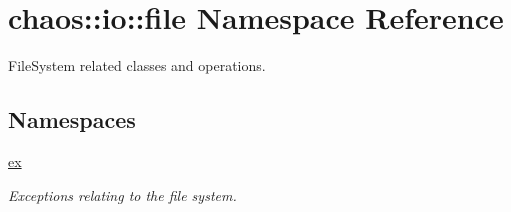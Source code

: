 \hypertarget{namespacechaos_1_1io_1_1file}{\section{chaos\-:\-:io\-:\-:file Namespace Reference}
\label{namespacechaos_1_1io_1_1file}
}


File\-System related classes and operations.  


\subsection*{Namespaces}
\begin{DoxyCompactItemize}
\item 
\hyperlink{namespacechaos_1_1io_1_1file_1_1ex}{ex}
\begin{DoxyCompactList}\small\item\em Exceptions relating to the file system. \end{DoxyCompactList}\end{DoxyCompactItemize}

